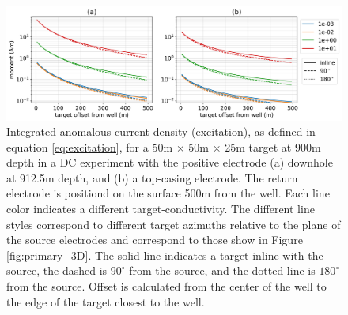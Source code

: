 \begin{figure}
    \begin{center}
    \includegraphics[width=\textwidth]{figures/dc_casing/excitation_3D.png}
    \end{center}
\caption{
    Integrated anomalous current density (excitation), as defined in equation \ref{eq:excitation},
    for a 50m $\times$ 50m $\times$ 25m target at 900m depth in a DC experiment with the positive electrode
    (a) downhole at 912.5m depth, and (b) a top-casing electrode. The return electrode is positiond on the
    surface 500m from the well. Each line color indicates a different target-conductivity. The different line
    styles correspond to different target azimuths relative to the plane of the source electrodes and correspond
    to those show in Figure \ref{fig:primary_3D}. The solid line indicates a target inline with the source,
    the dashed is $90^\circ$ from the source, and the dotted line is $180^{\circ}$ from the source. Offset is
    calculated from the center of the well to the edge of the target closest to the well.
}
\label{fig:excitation_3D}
\end{figure}
